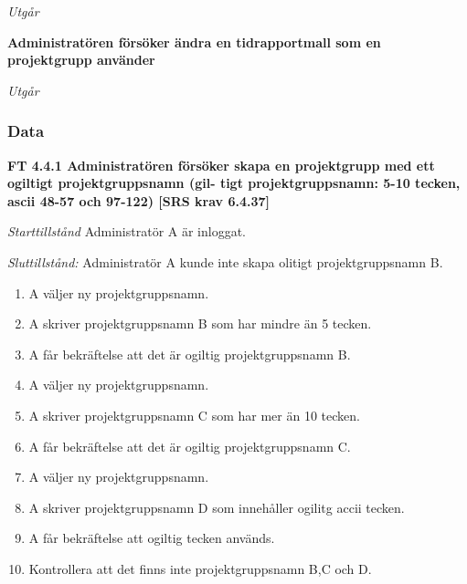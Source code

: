\documentclass[a4paper]{article}
\begin{document}
\begin{FT}
\emph{Utgår}



\item %
\textbf{Administratören försöker ändra en tidrapportmall som en projektgrupp använder}

\emph{Utgår}



\end{FT}
\subsubsection{Data}
\textbf{FT 4.4.1 Administratören försöker skapa en projektgrupp med ett ogiltigt projektgruppsnamn (gil- tigt projektgruppsnamn: 5-10 tecken, ascii 48-57 och 97-122) [SRS krav 6.4.37]}

\emph{Starttillstånd} Administratör A  är inloggat.

\emph{Sluttillstånd:} Administratör A kunde inte skapa olitigt projektgruppsnamn B.

\begin{enumerate}
\item A väljer ny projektgruppsnamn.
\item A skriver projektgruppsnamn B som har mindre än 5 tecken.
\item A får bekräftelse att det är ogiltig projektgruppsnamn B.
\item A väljer ny projektgruppsnamn.
\item A skriver projektgruppsnamn C som har mer än 10 tecken.
\item A får bekräftelse att det är ogiltig projektgruppsnamn C.
\item A väljer ny projektgruppsnamn.
\item A skriver projektgruppsnamn D som innehåller ogilitg accii tecken.
\item A får bekräftelse att ogiltig tecken används.
\item Kontrollera att det finns inte  projektgruppsnamn B,C och D.

\end{enumerate}
\end{document}
